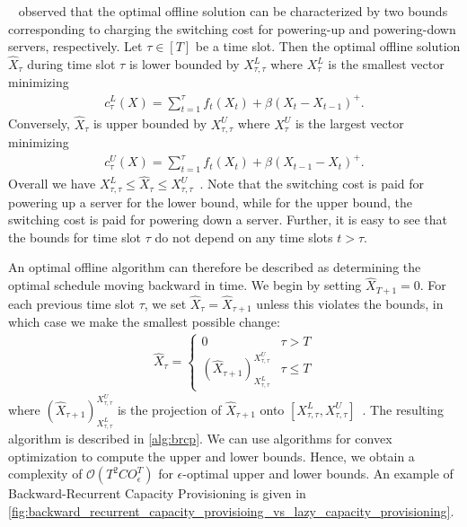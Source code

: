 \citeauthor*{Lin2011}~\cite{Lin2011} observed that the optimal offline solution can be characterized by two bounds corresponding to charging the switching cost for powering-up and powering-down servers, respectively. Let $\tau \in [T]$ be a time slot. Then the optimal offline solution $\hat{X}_{\tau}$ during time slot $\tau$ is lower bounded by $X_{\tau,\tau}^L$ where $X_{\tau}^L$ is the smallest vector minimizing \begin{align}\label{eq:ud:brcp:lower}
    c_{\tau}^L(X) = \sum_{t=1}^{\tau} f_t(X_t) + \beta (X_t - X_{t-1})^+.
\end{align} Conversely, $\hat{X}_{\tau}$ is upper bounded by $X_{\tau,\tau}^U$ where $X_{\tau}^U$ is the largest vector minimizing \begin{align}\label{eq:ud:brcp:upper}
    c_{\tau}^U(X) = \sum_{t=1}^{\tau} f_t(X_t) + \beta (X_{t-1} - X_t)^+.
\end{align} Overall we have $X_{\tau,\tau}^L \leq \hat{X}_{\tau} \leq X_{\tau,\tau}^U$~\cite{Lin2011}. Note that the switching cost is paid for powering up a server for the lower bound, while for the upper bound, the switching cost is paid for powering down a server. Further, it is easy to see that the bounds for time slot $\tau$ do not depend on any time slots $t > \tau$.

An optimal offline algorithm can therefore be described as determining the optimal schedule moving backward in time. We begin by setting $\hat{X}_{T+1} = 0$. For each previous time slot $\tau$, we set $\hat{X}_{\tau} = \hat{X}_{\tau + 1}$ unless this violates the bounds, in which case we make the smallest possible change: \begin{align*}
    \hat{X}_{\tau} = \begin{cases}
        0 & \tau > T \\
        (\hat{X}_{\tau+1})_{X_{\tau,\tau}^L}^{X_{\tau,\tau}^U} & \tau \leq T
    \end{cases}
\end{align*} where $(\hat{X}_{\tau+1})_{X_{\tau,\tau}^L}^{X_{\tau,\tau}^U}$ is the projection of $\hat{X}_{\tau+1}$ onto $[X_{\tau,\tau}^L, X_{\tau,\tau}^U]$~\cite{Lin2011}. The resulting algorithm is described in \cref{alg:brcp}. We can use algorithms for convex optimization to compute the upper and lower bounds. Hence, we obtain a complexity of $\mathcal{O}(T^2 C O_{\epsilon}^T)$ for $\epsilon$-optimal upper and lower bounds. An example of Backward-Recurrent Capacity Provisioning is given in \cref{fig:backward_recurrent_capacity_provisioing_vs_lazy_capacity_provisioning}.

